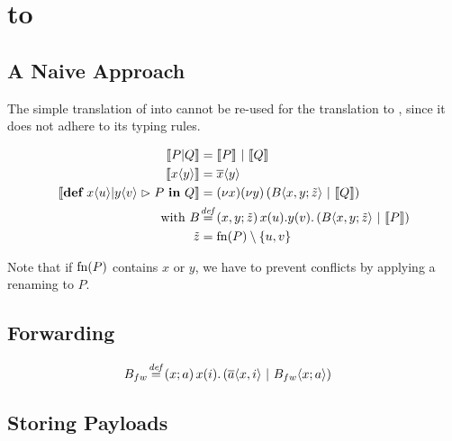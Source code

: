 \section{\CoreJoinCalc to \ActorPiCalc}

\subsection{A Naive Approach}

The simple translation of \joincalc into \asyncpicalc
\cite{fournet_reflexive_1996}
cannot be re-used for the translation to \actorpicalc,
since it does not adhere to its typing rules.

\begin{align*}
  \encMJtoAP{P \jpar Q}
  &= \encMJtoAP{P} \apar \encMJtoAP{Q}
  \\
  \encMJtoAP{\jsnd{x}{y}}
  &= \asnd{x}{y}
  \\
  \encMJtoAP{\jdef{\jrct{\jrcv{x}{u} \jpat \jrcv{y}{v}}{P}}{Q}}
  &= \anew{x}{\anew{y}{\parens{\ains{B}{x, y}{\tilde{z}} \apar \encMJtoAP{Q}}}}
  \\
  \text{with }
  \adef*{B}{x,y}{\tilde{z}}{\arcv{x}{u} . \arcv{y}{v} . \parens{\ains{B}{x, y}{\tilde{z}} \apar \encMJtoAP{P}}}
  \\
  \tilde{z}
  &= \fn{P} \setminus {\{u, v\}}
\end{align*}

Note that if $\operatorname{fn}(P)$ contains $x$ or $y$,
we have to prevent conflicts by applying a renaming to $P$.



\subsection{Forwarding}



\begin{align*}
  \adef*{B_{fw}}{x}{a}{\arcv{x}{i} . \parens{\asnd{a}{x,i} \apar \ains{B_{fw}}{x}{a}}}
\end{align*}

\subsection{Storing Payloads}


